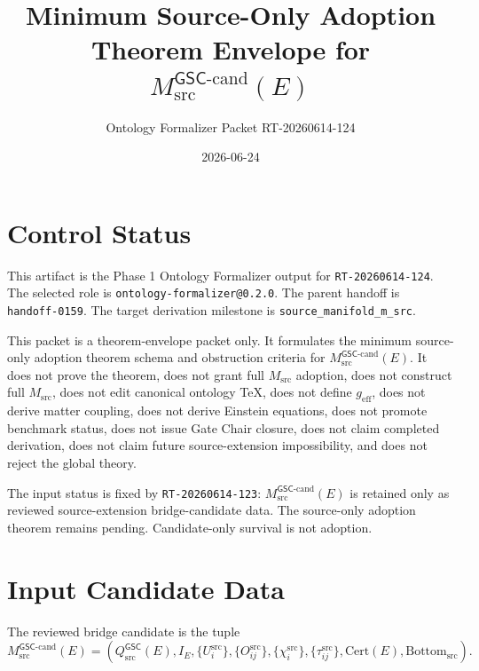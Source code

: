 \documentclass[11pt]{article}
\title{Minimum Source-Only Adoption Theorem Envelope for \(M_{\mathrm{src}}^{\mathsf{GSC}\mbox{-}\mathrm{cand}}(E)\)}
\author{Ontology Formalizer Packet RT-20260614-124}
\date{2026-06-24}
\newcommand{\GSC}{\mathsf{GSC}}
\newcommand{\Msrc}{M_{\mathrm{src}}}
\newcommand{\Mgsccand}{M_{\mathrm{src}}^{\GSC\mbox{-}\mathrm{cand}}}
\newcommand{\Qsrc}{Q_{\mathrm{src}}^{\GSC}}
\newcommand{\Bottomsrc}{\mathrm{Bottom}_{\mathrm{src}}}
\newcommand{\geff}{g_{\mathrm{eff}}}
\begin{document}
\maketitle

\section{Control Status}

This artifact is the Phase 1 Ontology Formalizer output for
\texttt{RT-20260614-124}. The selected role is
\texttt{ontology-formalizer@0.2.0}. The parent handoff is
\texttt{handoff-0159}. The target derivation milestone is
\texttt{source\_manifold\_m\_src}.

This packet is a theorem-envelope packet only. It formulates the minimum
source-only adoption theorem schema and obstruction criteria for
\(\Mgsccand(E)\). It does not prove the theorem, does not grant full
\(\Msrc\) adoption, does not construct full \(\Msrc\), does not edit
canonical ontology TeX, does not define \(\geff\), does not derive matter
coupling, does not derive Einstein equations, does not promote benchmark
status, does not issue Gate Chair closure, does not claim completed
derivation, does not claim future source-extension impossibility, and does
not reject the global theory.

The input status is fixed by \texttt{RT-20260614-123}: \(\Mgsccand(E)\)
is retained only as reviewed source-extension bridge-candidate data. The
source-only adoption theorem remains pending. Candidate-only survival is not
adoption.

\section{Input Candidate Data}

The reviewed bridge candidate is the tuple
\[
  \Mgsccand(E)=
  \left(
  \Qsrc(E),
  I_E,
  \{U_i^{\mathrm{src}}\},
  \{O_{ij}^{\mathrm{src}}\},
  \{\chi_i^{\mathrm{src}}\},
  \{\tau_{ij}^{\mathrm{src}}\},
  \mathrm{Cert}(E),
  \Bottomsrc
  \right).
\]
\end{document}
